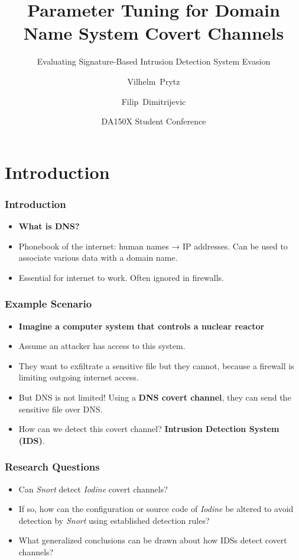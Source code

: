 \documentclass{beamer}
\title[Student Conference] %
{Parameter Tuning for Domain Name System Covert Channels}
\subtitle{Evaluating Signature-Based Intrusion Detection System Evasion}
\author[Prytz, Dimitrijevic] %
{Vilhelm~Prytz \and Filip~Dimitrijevic}
\institute[KTH]{EECS\\ KTH Royal Institute of Technology}
\date[May 28, 2025] %
{DA150X Student Conference}
\begin{document}
\frame{\titlepage}


\section{Introduction}


\begin{frame}
\frametitle{Introduction}

\begin{itemize}
    \item<1->\textbf{What is DNS?}
    \item<2->Phonebook of the internet: human names → IP addresses. Can be used to associate various data with a domain name.
    \item<3->Essential for internet to work. Often ignored in firewalls.
\end{itemize}

\end{frame}

\begin{frame}
\frametitle{Example Scenario}

\begin{itemize}
    \item<1->\textbf{Imagine a computer system that controls a nuclear reactor}
    \item<2->Assume an attacker has access to this system.
    \item<3->They want to exfiltrate a sensitive file but they cannot, because a firewall is limiting outgoing internet access.
    \item<4->But DNS is not limited! Using a \textbf{DNS covert channel}, they can send the sensitive file over DNS.
    \item<5->How can we detect this covert channel? \textbf{Intrusion Detection System (IDS)}.
\end{itemize}
    
\end{frame}


\begin{frame}
\frametitle{Research Questions}

\begin{itemize}
    \item<1-> Can \textit{Snort} detect \textit{Iodine} covert channels?
    \item<2-> If so, how can the configuration or source code of \textit{Iodine} be altered to avoid detection by \textit{Snort} using established detection rules?
    \item<3-> What generalized conclusions can be drawn about how IDSs detect covert channels?
\end{itemize}
\end{frame}
\end{document}
